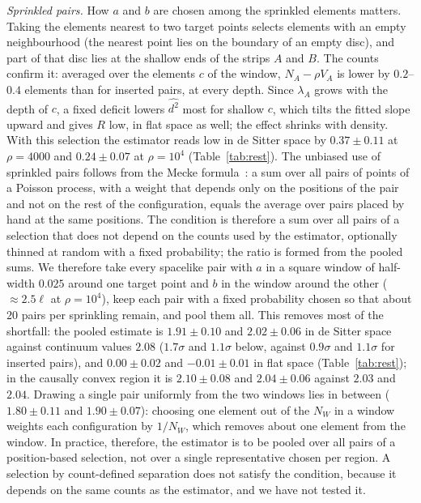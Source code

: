 \documentclass[prd,twocolumn,superscriptaddress,nofootinbib,amsmath,amssymb,floatfix]{revtex4-2}
\begin{document}
\emph{Sprinkled pairs.} How $a$ and $b$ are chosen among the sprinkled elements matters. Taking the elements nearest to two target points selects elements with an empty neighbourhood (the nearest point lies on the boundary of an empty disc), and part of that disc lies at the shallow ends of the strips $A$ and $B$. The counts confirm it: averaged over the elements $c$ of the window, $N_A-\rho V_A$ is lower by $0.2$--$0.4$ elements than for inserted pairs, at every depth. Since $\lambda_A$ grows with the depth of $c$, a fixed deficit lowers $\widehat{d^2}$ most for shallow $c$, which tilts the fitted slope upward and gives $R$ low, in flat space as well; the effect shrinks with density. With this selection the estimator reads low in de Sitter space by $0.37\pm0.11$ at $\rho=4000$ and $0.24\pm0.07$ at $\rho=10^4$ (Table~\ref{tab:rest}). The unbiased use of sprinkled pairs follows from the Mecke formula~\cite{LastPenrose17}: a sum over all pairs of points of a Poisson process, with a weight that depends only on the positions of the pair and not on the rest of the configuration, equals the average over pairs placed by hand at the same positions. The condition is therefore a sum over all pairs of a selection that does not depend on the counts used by the estimator, optionally thinned at random with a fixed probability; the ratio is formed from the pooled sums. We therefore take every spacelike pair with $a$ in a square window of half-width $0.025$ around one target point and $b$ in the window around the other ($\approx2.5\ell$ at $\rho=10^4$), keep each pair with a fixed probability chosen so that about $20$ pairs per sprinkling remain, and pool them all. This removes most of the shortfall: the pooled estimate is $1.91\pm0.10$ and $2.02\pm0.06$ in de Sitter space against continuum values $2.08$ ($1.7\sigma$ and $1.1\sigma$ below, against $0.9\sigma$ and $1.1\sigma$ for inserted pairs), and $0.00\pm0.02$ and $-0.01\pm0.01$ in flat space (Table~\ref{tab:rest}); in the causally convex region it is $2.10\pm0.08$ and $2.04\pm0.06$ against $2.03$ and $2.04$. Drawing a single pair uniformly from the two windows lies in between ($1.80\pm0.11$ and $1.90\pm0.07$): choosing one element out of the $N_W$ in a window weights each configuration by $1/N_W$, which removes about one element from the window. In practice, therefore, the estimator is to be pooled over all pairs of a position-based selection, not over a single representative chosen per region. A selection by count-defined separation does not satisfy the condition, because it depends on the same counts as the estimator, and we have not tested it.
\end{document}
